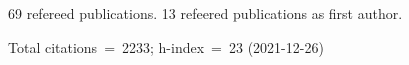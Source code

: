 69 refereed publications. 13 refeered publications as first author.

Total citations~=~2233; h-index~=~23 (2021-12-26)